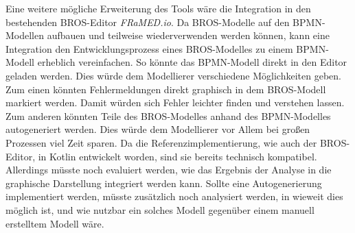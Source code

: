 Eine weitere mögliche Erweiterung des Tools wäre die Integration in den bestehenden BROS-Editor \emph{FRaMED.io}.
Da BROS-Modelle auf den BPMN-Modellen aufbauen und teilweise wiederverwenden werden können, kann eine Integration den Entwicklungsprozess eines BROS-Modelles zu einem BPMN-Modell erheblich vereinfachen.
So könnte das BPMN-Modell direkt in den Editor geladen werden.
Dies würde dem Modellierer verschiedene Möglichkeiten geben.
Zum einen könnten Fehlermeldungen direkt graphisch in dem BROS-Modell markiert werden.
Damit würden sich Fehler leichter finden und verstehen lassen.
Zum anderen könnten Teile des BROS-Modelles anhand des BPMN-Modelles autogeneriert werden.
Dies würde dem Modellierer vor Allem bei großen Prozessen viel Zeit sparen.
Da die Referenzimplementierung, wie auch der BROS-Editor, in Kotlin entwickelt worden, sind sie bereits technisch kompatibel.
Allerdings müsste noch evaluiert werden, wie das Ergebnis der Analyse in die graphische Darstellung integriert werden kann.
Sollte eine Autogenerierung implementiert werden, müsste zusätzlich noch analysiert werden, in wieweit dies möglich ist, und wie nutzbar ein solches Modell gegenüber einem manuell erstelltem Modell wäre.
